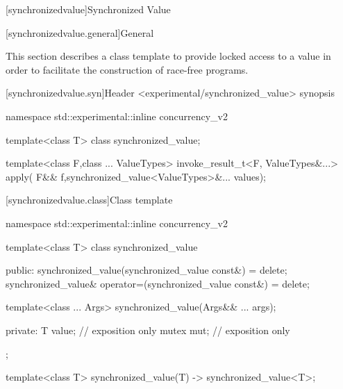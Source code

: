 \setcounter{chapter}{7}
[synchronizedvalue]{Synchronized Value}

[synchronizedvalue.general]{General}

This section describes a class template to provide locked access to a
value in order to facilitate the construction of race-free programs.

[synchronizedvalue.syn]{Header <experimental/synchronized_value> synopsis}

\begin{codeblock}
namespace std::experimental::inline concurrency_v2 {
    template<class T>
    class synchronized_value;

    template<class F,class ... ValueTypes>
    invoke_result_t<F, ValueTypes&...> apply(
        F&& f,synchronized_value<ValueTypes>&... values);
}
\end{codeblock}

[synchronizedvalue.class]{Class template  }

\begin{codeblock}
namespace std::experimental::inline concurrency_v2 {
  template<class T>
    class synchronized_value
    {
    public:
        synchronized_value(synchronized_value const&) = delete;
        synchronized_value& operator=(synchronized_value const&) = delete;

        template<class ... Args>
        synchronized_value(Args&& ... args);

    private:
        T value; // exposition only
        mutex mut; // exposition only
    };

template<class T>
synchronized_value(T)
-> synchronized_value<T>;
}
\end{codeblock}

